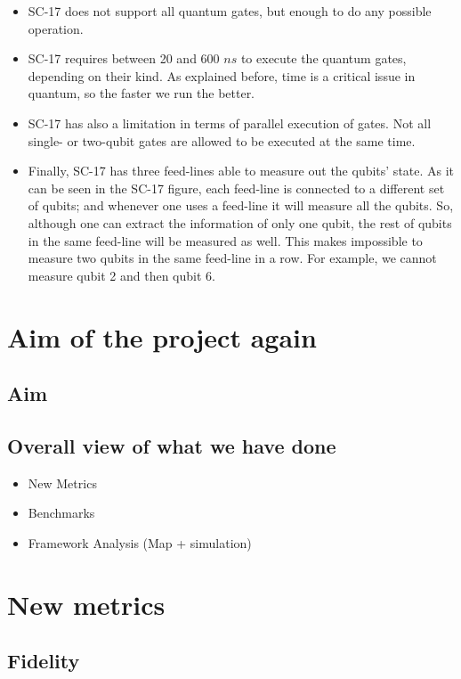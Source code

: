 \documentclass[11pt]{article}
\begin{document}
\begin{itemize}
\item SC-17 does not support all quantum gates, but enough to do any possible operation.
\item SC-17 requires between 20 and 600 \(ns\) to execute the quantum gates, depending on their kind. As explained before, time is a critical issue in quantum, so the faster we run the better.
\item SC-17 has also a limitation in terms of parallel execution of gates. Not all single- or two-qubit gates are allowed to be executed at the same time.
\item Finally, SC-17 has three feed-lines able to measure out the qubits' state. As it can be seen in the SC-17 figure, each feed-line is connected to a different set of qubits; and whenever one uses a feed-line it will measure all the qubits. So, although one can extract the information of only one qubit, the rest of qubits in the same feed-line will be measured as well. This makes impossible to measure two qubits in the same feed-line in a row. For example, we cannot measure qubit 2 and then qubit 6.
\end{itemize}

\section{Aim of the project again}
\label{sec:org152a912}
\subsection{Aim}
\label{sec:orgbd3c714}
\subsection{Overall view of what we have done}
\label{sec:org26b7d2a}

\begin{itemize}
\item New Metrics
\item Benchmarks
\item Framework Analysis (Map + simulation)
\end{itemize}

\section{New metrics}
\label{sec:org6562b5c}

\subsection{Fidelity}
\label{sec:org34c145d}
\end{document}
